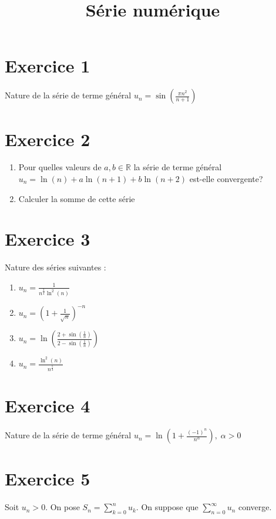 \documentclass[11pt]{article}
\author{\Name \texttt{\Login}}
\date{}
\title{Série numérique}
\begin{document}
\maketitle

\section*{Exercice 1}

Nature de la série de terme général $u_n=\sin(\frac{\pi n^2}{n+1})$ 
\section*{Exercice 2}

\begin{enumerate}
\item Pour quelles valeurs de $a,b\in \mathbb{R}$ la série de terme général $u_n=\ln(n) + a\ln(n+1) +b\ln(n+2)$ est-elle convergente?
\item Calculer la somme de cette série
\end{enumerate}


\section*{Exercice 3}

Nature des séries suivantes :

\begin{enumerate}

\item $u_n=\frac{1}{n^{\frac{3}{4}}\ln^2(n)}$
\item $u_n=(1+\frac{1}{\sqrt{n}})^{-n}$
\item $u_n=\ln(\frac{2+\sin(\frac{1}{n})}{2-\sin(\frac{1}{n})})$
\item $u_n=\frac{\ln^2(n)}{n^{\frac{5}{4}}}$

\end{enumerate}

\section*{Exercice 4}

Nature de la série de terme général $u_n=\ln(1+\frac{(-1)^n}{n^{\alpha}}),\; \alpha>0$

\section*{Exercice 5}

Soit $u_n>0$. On pose $S_n=\sum_{k=0}^{n} u_k$. On suppose que $\sum_{n=0}^\infty u_n$ converge.
\end{document}

